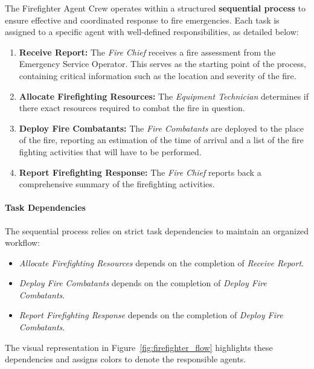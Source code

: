 The Firefighter Agent Crew operates within a structured \textbf{sequential process} to ensure effective and coordinated response to fire emergencies. Each task is assigned to a specific agent with well-defined responsibilities, as detailed below:

\begin{enumerate}
    \item \textbf{Receive Report:} The \textit{Fire Chief} receives a fire assessment from the Emergency Service Operator. This serves as the starting point of the process, containing critical information such as the location and severity of the fire.
    \item \textbf{Allocate Firefighting Resources:} The \textit{Equipment Technician} determines if there exact resources required to combat the fire in question.
	\item \textbf{Deploy Fire Combatants:} The \textit{Fire Combatants} are deployed to the place of the fire, reporting an estimation of the time of arrival and a list of the fire fighting activities that will have to be performed.
	\item \textbf{Report Firefighting Response:} The \textit{Fire Chief} reports back a comprehensive summary of the firefighting activities.
\end{enumerate}

\paragraph{Task Dependencies}
The sequential process relies on strict task dependencies to maintain an organized workflow:
\begin{itemize}
    \item \textit{Allocate Firefighting Resources} depends on the completion of \textit{Receive Report}.
    \item \textit{Deploy Fire Combatants} depends on the completion of \textit{Deploy Fire Combatants}.
    \item \textit{Report Firefighting Response} depends on the completion of \textit{Deploy Fire Combatants}.
\end{itemize}

The visual representation in Figure~\ref{fig:firefighter_flow} highlights these dependencies and assigns colors to denote the responsible agents.

